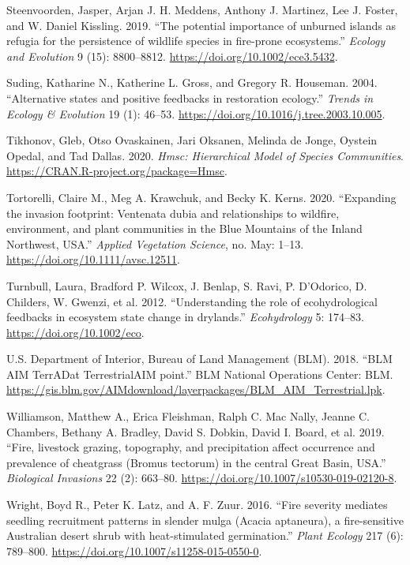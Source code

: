 \documentclass[
  12pt,
]{article}
\newlength{\cslhangindent}
\newlength{\cslentryspacingunit} %
\newenvironment{CSLReferences}[2] %
 {%
  \setlength{\parindent}{0pt}
  \ifodd #1
  \let\oldpar\par
  \def\par{\hangindent=\cslhangindent\oldpar}
  \fi
  \setlength{\parskip}{#2\cslentryspacingunit}
 }%
 {}
\begin{document}
\begin{CSLReferences}{1}{0}
\leavevmode{}%
Steenvoorden, Jasper, Arjan J. H. Meddens, Anthony J. Martinez, Lee J.
Foster, and W. Daniel Kissling. 2019. {``{The potential importance of
unburned islands as refugia for the persistence of wildlife species in
fire-prone ecosystems}.''} \emph{Ecology and Evolution} 9 (15):
8800--8812. \url{https://doi.org/10.1002/ece3.5432}.

\leavevmode{}%
Suding, Katharine N., Katherine L. Gross, and Gregory R. Houseman. 2004.
{``{Alternative states and positive feedbacks in restoration
ecology}.''} \emph{Trends in Ecology \& Evolution} 19 (1): 46--53.
\url{https://doi.org/10.1016/j.tree.2003.10.005}.

\leavevmode{}%
Tikhonov, Gleb, Otso Ovaskainen, Jari Oksanen, Melinda de Jonge, Oystein
Opedal, and Tad Dallas. 2020. \emph{Hmsc: Hierarchical Model of Species
Communities}. \url{https://CRAN.R-project.org/package=Hmsc}.

\leavevmode{}%
Tortorelli, Claire M., Meg A. Krawchuk, and Becky K. Kerns. 2020.
{``{Expanding the invasion footprint: Ventenata dubia and relationships
to wildfire, environment, and plant communities in the Blue Mountains of
the Inland Northwest, USA}.''} \emph{Applied Vegetation Science}, no.
May: 1--13. \url{https://doi.org/10.1111/avsc.12511}.

\leavevmode{}%
Turnbull, Laura, Bradford P. Wilcox, J. Benlap, S. Ravi, P. D'Odorico,
D. Childers, W. Gwenzi, et al. 2012. {``{Understanding the role of
ecohydrological feedbacks in ecosystem state change in drylands}.''}
\emph{Ecohydrology} 5: 174--83. \url{https://doi.org/10.1002/eco}.

\leavevmode{}%
U.S. Department of Interior, Bureau of Land Management (BLM). 2018.
{``{BLM AIM TerrADat TerrestrialAIM point}.''} BLM National Operations
Center: BLM.
\url{https://gis.blm.gov/AIMdownload/layerpackages/BLM_AIM_Terrestrial.lpk}.

\leavevmode{}%
Williamson, Matthew A., Erica Fleishman, Ralph C. Mac Nally, Jeanne C.
Chambers, Bethany A. Bradley, David S. Dobkin, David I. Board, et al.
2019. {``{Fire, livestock grazing, topography, and precipitation affect
occurrence and prevalence of cheatgrass (Bromus tectorum) in the central
Great Basin, USA}.''} \emph{Biological Invasions} 22 (2): 663--80.
\url{https://doi.org/10.1007/s10530-019-02120-8}.

\leavevmode{}%
Wright, Boyd R., Peter K. Latz, and A. F. Zuur. 2016. {``{Fire severity
mediates seedling recruitment patterns in slender mulga (Acacia
aptaneura), a fire-sensitive Australian desert shrub with
heat-stimulated germination}.''} \emph{Plant Ecology} 217 (6): 789--800.
\url{https://doi.org/10.1007/s11258-015-0550-0}.

\end{CSLReferences}
\end{document}

